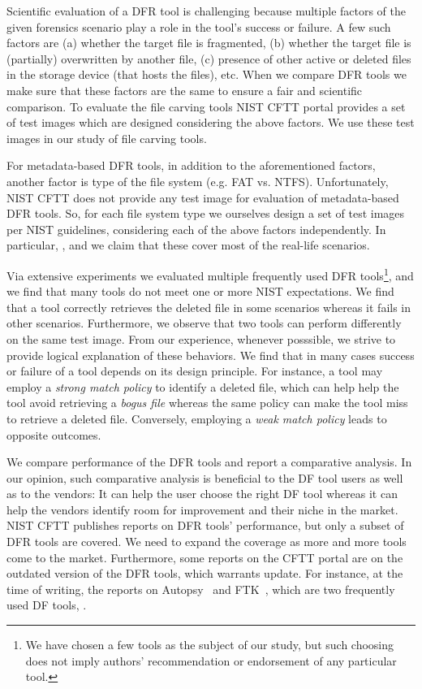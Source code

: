Scientific evaluation of a DFR tool is challenging because multiple factors of the given forensics scenario play a role in the tool's success or failure.
A few such factors are (a) whether the target file is fragmented, (b) whether the target file is (partially) overwritten by another file, 
(c) presence of other active or deleted files in the storage device (that hosts the files), etc.
When we compare DFR tools we make sure that these factors are the same to ensure a fair and scientific comparison.
To evaluate the file carving tools NIST CFTT portal provides a set of test images which are designed considering the above factors.
We use these test images in our study of file carving tools. 

For metadata-based DFR tools, in addition to the aforementioned factors, another factor is type of the file system (e.g. FAT vs. NTFS). 
Unfortunately, NIST CFTT does not provide any test image for evaluation of metadata-based DFR tools.
So, for each file system type we ourselves design a set of test images per NIST guidelines, considering each of the above factors independently.
In particular, , and we claim that these cover most of the real-life scenarios.


Via extensive experiments we evaluated multiple frequently used DFR tools\footnote{We have chosen a few tools as the subject of our study, 
but such choosing does not imply authors' recommendation or endorsement of any particular tool.}, and we find that many tools do not meet one or more NIST expectations.
We find that a tool correctly retrieves the deleted file in some scenarios whereas it fails in other scenarios. Furthermore, we observe that 
two tools can perform differently on the same test image. From our experience, whenever posssible, 
we strive to provide logical explanation of these behaviors. We find that in many cases 
success or failure of a tool depends on its design principle. 
For instance, a tool may employ a \emph{strong match policy} to identify a deleted file, which can help help the tool avoid retrieving a \emph{bogus file} 
whereas the same policy can make the tool miss to retrieve a deleted file. Conversely, employing a \emph{weak match policy} leads to opposite outcomes. 
 
We compare performance of the DFR tools and report a comparative analysis. In our opinion, such comparative analysis is beneficial to the DF tool 
users as well as to the vendors: It can help the user choose the right DF tool whereas it can help the vendors identify room for improvement and their niche in the market. 
NIST CFTT publishes reports on DFR tools' performance, but only a subset of DFR tools are covered. 
We need to expand the coverage as more and more tools come to the market.
Furthermore, some reports on the CFTT portal are on the outdated version of the DFR tools, which warrants update. 
For instance, at the time of writing, the reports on Autopsy~\cite{dhs:autopsy} and FTK~\cite{dhs:ftk}, which are two frequently used DF tools, 
.   

